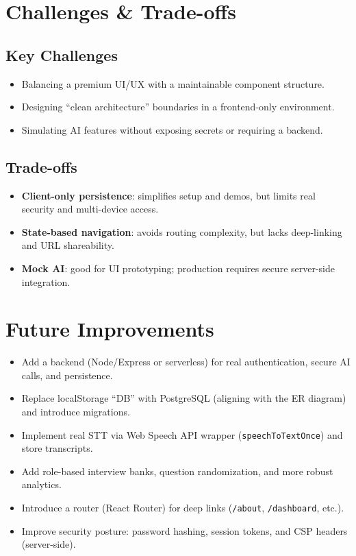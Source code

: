 \documentclass[11pt]{article}
\begin{document}
\section{Challenges \& Trade-offs}

\subsection{Key Challenges}
\begin{itemize}[leftmargin=1.2em]
  \item Balancing a premium UI/UX with a maintainable component structure.
  \item Designing ``clean architecture'' boundaries in a frontend-only environment.
  \item Simulating AI features without exposing secrets or requiring a backend.
\end{itemize}

\subsection{Trade-offs}
\begin{itemize}[leftmargin=1.2em]
  \item \textbf{Client-only persistence}: simplifies setup and demos, but limits real security and multi-device access.
  \item \textbf{State-based navigation}: avoids routing complexity, but lacks deep-linking and URL shareability.
  \item \textbf{Mock AI}: good for UI prototyping; production requires secure server-side integration.
\end{itemize}

\section{Future Improvements}
\begin{itemize}[leftmargin=1.2em]
  \item Add a backend (Node/Express or serverless) for real authentication, secure AI calls, and persistence.
  \item Replace localStorage ``DB'' with PostgreSQL (aligning with the ER diagram) and introduce migrations.
  \item Implement real STT via Web Speech API wrapper (\texttt{speechToTextOnce}) and store transcripts.
  \item Add role-based interview banks, question randomization, and more robust analytics.
  \item Introduce a router (React Router) for deep links (\texttt{/about}, \texttt{/dashboard}, etc.).
  \item Improve security posture: password hashing, session tokens, and CSP headers (server-side).
\end{itemize}
\end{document}
